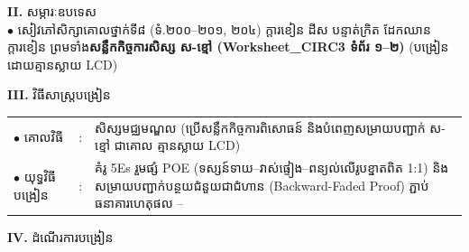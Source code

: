 \documentclass[a4paper,10pt]{article}
\newcommand{\en}[1]{{\TimesEn #1}}
\newcommand{\cnum}[1]{{\fontsize{10.5pt}{12pt}\selectfont\ding{\numexpr181+#1\relax}}\hspace{0.2em}}
\begin{document}
{%
\textbf{II.} {\muol សម្ភារៈឧបទេស}\\[1pt]
\hspace*{0.55cm}$\bullet$ \hspace{0.35cm} សៀវភៅសិក្សាគោលថ្នាក់ទី៨ (ទំ.២០០--២០១, ២០៤) ក្ដារខៀន ដីស បន្ទាត់ក្រិត ដែកឈានក្ដារខៀន ព្រមទាំង\textbf{សន្លឹកកិច្ចការសិស្ស ស-ខ្មៅ (\en{Worksheet\_CIRC3} ទំព័រ ១--២)} (បង្រៀនដោយគ្មានស្លាយ \en{LCD})

\vspace{1pt}

\textbf{III.} {\muol វិធីសាស្រ្តបង្រៀន}\\[1pt]
\hspace*{0.45cm}%
\begin{tabular}{@{}l l L{14.85cm}@{}}
  $\bullet$ \hspace{0.25cm} គោលវិធី & : & សិស្សមជ្ឈមណ្ឌល (ប្រើសន្លឹកកិច្ចការពិសោធន៍ និងបំពេញសម្រាយបញ្ជាក់ ស-ខ្មៅ ជាគោល គ្មានស្លាយ \en{LCD}) \\
  $\bullet$ \hspace{0.25cm} យុទ្ធវិធីបង្រៀន & : & គំរូ 5Es រួមផ្សំ \en{POE} (ទស្សន៍ទាយ--វាស់ផ្ទៀង--ពន្យល់លើរូបខ្នាតពិត 1:1) និងសម្រាយបញ្ជាក់បន្ថយជំនួយជាជំហាន (\en{Backward-Faded Proof}) ភ្ជាប់ធនាគារហេតុផល \cnum{1}--\cnum{5} \\
\end{tabular}
}

\vspace{1pt}

\textbf{IV.} {\muol ដំណើរការបង្រៀន}

\vspace{1pt}
\end{document}
